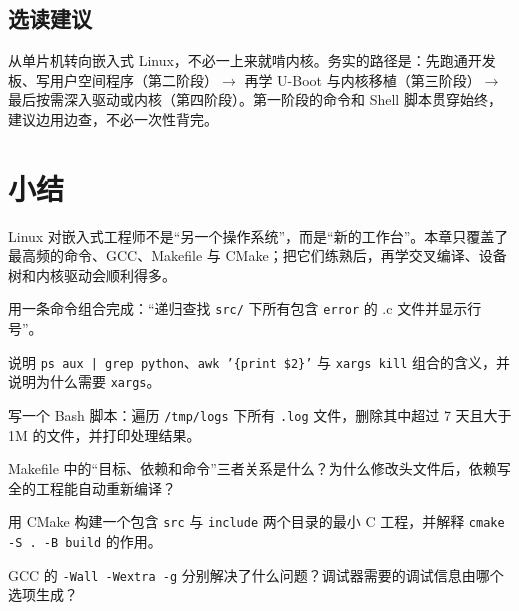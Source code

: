 \subsection*{选读建议}
从单片机转向嵌入式 Linux，不必一上来就啃内核。务实的路径是：先跑通开发板、写用户空间程序（第二阶段）\(\rightarrow\) 再学 U-Boot 与内核移植（第三阶段）\(\rightarrow\) 最后按需深入驱动或内核（第四阶段）。第一阶段的命令和 Shell 脚本贯穿始终，建议边用边查，不必一次性背完。

\section{小结}

Linux 对嵌入式工程师不是“另一个操作系统”，而是“新的工作台”。本章只覆盖了最高频的命令、GCC、Makefile 与 CMake；把它们练熟后，再学交叉编译、设备树和内核驱动会顺利得多。

\begin{problemset}
\item 用一条命令组合完成：“递归查找 \texttt{src/} 下所有包含 \texttt{error} 的 .c 文件并显示行号”。
\item 说明 \texttt{ps aux | grep python}、\texttt{awk '\{print \$2\}'} 与 \texttt{xargs kill} 组合的含义，并说明为什么需要 \texttt{xargs}。
\item 写一个 Bash 脚本：遍历 \texttt{/tmp/logs} 下所有 \texttt{.log} 文件，删除其中超过 7 天且大于 1M 的文件，并打印处理结果。
\item Makefile 中的“目标、依赖和命令”三者关系是什么？为什么修改头文件后，依赖写全的工程能自动重新编译？
\item 用 CMake 构建一个包含 \texttt{src} 与 \texttt{include} 两个目录的最小 C 工程，并解释 \texttt{cmake -S . -B build} 的作用。
\item GCC 的 \texttt{-Wall -Wextra -g} 分别解决了什么问题？调试器需要的调试信息由哪个选项生成？
\end{problemset}
